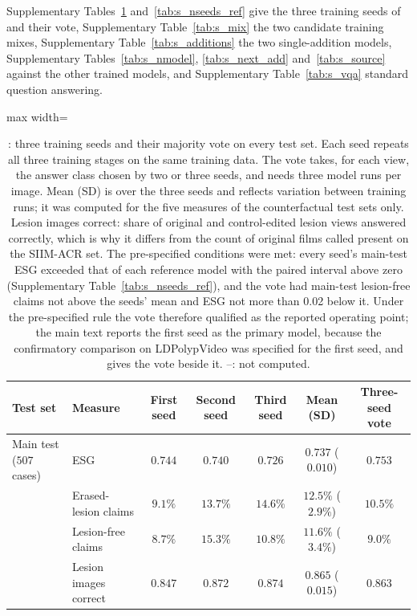 Supplementary Tables~\ref{tab:s_nseeds} and~\ref{tab:s_nseeds_ref} give the three training seeds of \msn{} and their vote, Supplementary Table~\ref{tab:s_mix} the two candidate training mixes, Supplementary Table~\ref{tab:s_additions} the two single-addition models, Supplementary Tables~\ref{tab:s_nmodel}, \ref{tab:s_next_add} and~\ref{tab:s_source} \msn{} against the other trained models, and Supplementary Table~\ref{tab:s_vqa} standard question answering.

\begin{table}[!htbp]
\caption{\msn{}: three training seeds and their majority vote on every test set. Each seed repeats all three training stages on the same training data. The vote takes, for each view, the answer class chosen by two or three seeds, and needs three model runs per image. Mean (SD) is over the three seeds and reflects variation between training runs; it was computed for the five measures of the counterfactual test sets only. Lesion images correct: share of original and control-edited lesion views answered correctly, which is why it differs from the count of original films called present on the SIIM-ACR set. The pre-specified conditions were met: every seed's main-test ESG exceeded that of each reference model with the paired interval above zero (Supplementary Table~\ref{tab:s_nseeds_ref}), and the vote had main-test lesion-free claims not above the seeds' mean and ESG not more than 0.02 below it. Under the pre-specified rule the vote therefore qualified as the reported operating point; the main text reports the first seed as the primary model, because the confirmatory comparison on LDPolypVideo was specified for the first seed, and gives the vote beside it. --: not computed.}
\label{tab:s_nseeds}
\centering
\footnotesize
\begin{adjustbox}{max width=\linewidth}
\begin{tabular}{ll ccc c c}
\toprule
Test set & Measure & First seed & Second seed & Third seed & Mean (SD) & Three-seed vote \\
\midrule
Main test ($507$ cases) & ESG & $0.744$ & $0.740$ & $0.726$ & $0.737$ ($0.010$) & $0.753$ \\
 & Erased-lesion claims & $9.1\%$ & $13.7\%$ & $14.6\%$ & $12.5\%$ ($2.9\%$) & $10.5\%$ \\
 & Lesion-free claims & $8.7\%$ & $15.3\%$ & $10.8\%$ & $11.6\%$ ($3.4\%$) & $9.0\%$ \\
 & Lesion images correct & $0.847$ & $0.872$ & $0.874$ & $0.865$ ($0.015$) & $0.863$ \\

\end{tabular}
\end{adjustbox}
\end{table}
